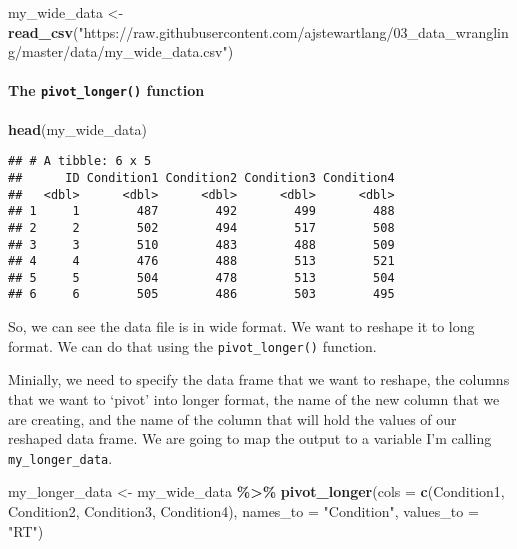 \documentclass[
]{book}
\newenvironment{Shaded}{\begin{snugshade}}{\end{snugshade}}
\newcommand{\AttributeTok}[1]{\textcolor[rgb]{0.13,0.29,0.53}{#1}}
\newcommand{\FunctionTok}[1]{\textcolor[rgb]{0.13,0.29,0.53}{\textbf{#1}}}
\newcommand{\NormalTok}[1]{#1}
\newcommand{\OtherTok}[1]{\textcolor[rgb]{0.56,0.35,0.01}{#1}}
\newcommand{\SpecialCharTok}[1]{\textcolor[rgb]{0.81,0.36,0.00}{\textbf{#1}}}
\newcommand{\StringTok}[1]{\textcolor[rgb]{0.31,0.60,0.02}{#1}}
\begin{document}
\begin{Shaded}
\begin{Highlighting}[]
\NormalTok{my\_wide\_data }\OtherTok{\textless{}{-}} \FunctionTok{read\_csv}\NormalTok{(}\StringTok{"https://raw.githubusercontent.com/ajstewartlang/03\_data\_wrangling/master/data/my\_wide\_data.csv"}\NormalTok{)}
\end{Highlighting}
\end{Shaded}

\hypertarget{the-pivot_longer-function}{%
\paragraph*{\texorpdfstring{The \texttt{pivot\_longer()} function}{The pivot\_longer() function}}\label{the-pivot_longer-function}}

\begin{Shaded}
\begin{Highlighting}[]
\FunctionTok{head}\NormalTok{(my\_wide\_data)}
\end{Highlighting}
\end{Shaded}

\begin{verbatim}
## # A tibble: 6 x 5
##      ID Condition1 Condition2 Condition3 Condition4
##   <dbl>      <dbl>      <dbl>      <dbl>      <dbl>
## 1     1        487        492        499        488
## 2     2        502        494        517        508
## 3     3        510        483        488        509
## 4     4        476        488        513        521
## 5     5        504        478        513        504
## 6     6        505        486        503        495
\end{verbatim}

So, we can see the data file is in wide format. We want to reshape it to long format. We can do that using the \texttt{pivot\_longer()} function.

Minially, we need to specify the data frame that we want to reshape, the columns that we want to `pivot' into longer format, the name of the new column that we are creating, and the name of the column that will hold the values of our reshaped data frame. We are going to map the output to a variable I'm calling \texttt{my\_longer\_data}.

\begin{Shaded}
\begin{Highlighting}[]
\NormalTok{my\_longer\_data }\OtherTok{\textless{}{-}}\NormalTok{ my\_wide\_data }\SpecialCharTok{\%\textgreater{}\%}
  \FunctionTok{pivot\_longer}\NormalTok{(}\AttributeTok{cols =} \FunctionTok{c}\NormalTok{(Condition1, Condition2, Condition3, Condition4), }
               \AttributeTok{names\_to =} \StringTok{"Condition"}\NormalTok{, }
               \AttributeTok{values\_to =} \StringTok{"RT"}\NormalTok{)}
\end{Highlighting}
\end{Shaded}
\end{document}

